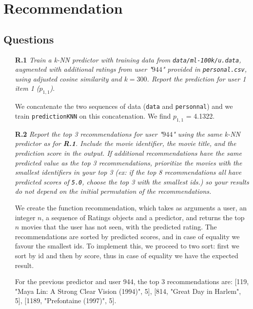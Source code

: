 \documentclass{article}
\begin{document}
\section{Recommendation}

\subsection{Questions}
\label{section:q4}

\begin{itemize} 
   \item [\textbf{R.1}] \textit{Train a k-NN predictor with training data from \texttt{data/ml-100k/u.data}, augmented with additional ratings from user "$944$" provided in \texttt{personal.csv}, using adjusted cosine similarity and $k=300$. Report the prediction for user 1 item 1 ($p_{1,1}$)}.
   
   We concatenate the two sequences of data (\texttt{data} and \texttt{personnal}) and we train \texttt{predictionKNN} on this concatenation. We find $p_{1,1}$ = 4.1322.

  \item [\textbf{R.2}] \textit{Report the top 3 recommendations for user "$944$" using the same k-NN predictor as for \textbf{R.1}.  Include the movie identifier, the movie title, and the prediction score in the output. If additional recommendations have the same predicted value as the top 3 recommendations, prioritize the movies with the smallest identifiers in your top 3 (ex: if the top 8 recommendations all have predicted scores of \texttt{5.0}, choose the top 3 with the smallest ids.) so your results do not depend on the initial permutation of the recommendations.}
  
  We create the function recommendation, which takes as arguments a user, an integer $n$, a sequence of Ratings objects and a predictor, and returns the top $n$ movies that the user has not seen, with the predicted rating. The recommendations are sorted by predicted scores, and in case of equality we favour the smallest ids. To implement this, we proceed to two sort: first we sort by id and then by score, thus in case of equality we have the expected result.
  
  For the previous predictor and user 944, the top 3 recommendations are: [119, "Maya Lin: A Strong Clear Vision (1994)", 5], [814, "Great Day in Harlem", 5], [1189, "Prefontaine (1997)", 5].
  
\end{itemize}
\end{document}
